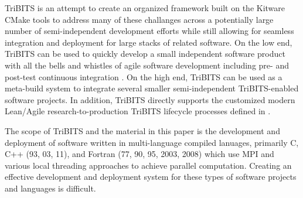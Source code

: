 \documentclass[note]{TechNote}
\begin{document}
TriBITS is an attempt to create an organized framework built on the Kitware CMake tools to address many of these challanges across a potentially large number of semi-independent development efforts while still allowing for seamless integration and deployment for large stacks of related software.  On the low end, TriBITS can be used to quickly develop a small independent software product with all the bells and whistles of agile software development including pre- and post-test continuous integration \cite{XP2, ContinuousIntegration07}.  On the high end, TriBITS can be used as a meta-build system to integrate several smaller semi-independent TriBITS-enabled software projects.  In addition, TriBITS directly supports the customized modern Lean/Agile research-to-production TriBITS lifecycle processes defined in \cite{TribitsLifecycleModel, TribitsLifecycleModel_eScience2012}.

The scope of TriBITS and the material in this paper is the development and deployment of software written in multi-language compiled lanuages, primarily C, C++ (93, 03, 11), and Fortran (77, 90, 95, 2003, 2008) which use MPI and various local threading approaches to achieve parallel computation.  Creating an effective development and deployment system for these types of software projects and languages is difficult.
\end{document}
